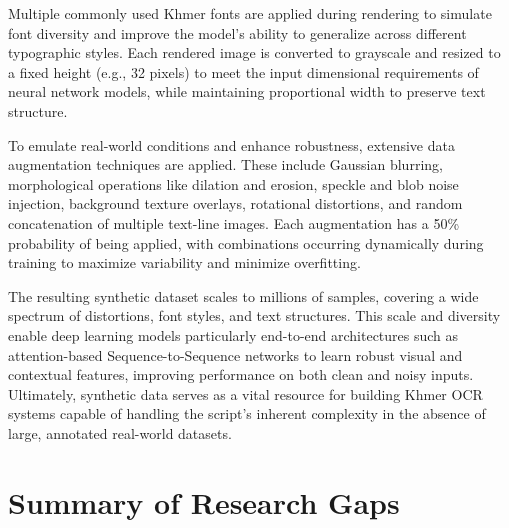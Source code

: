 Multiple commonly used Khmer fonts are applied during rendering to simulate font diversity and 
improve the model's ability to generalize across different typographic styles. Each rendered 
image is converted to grayscale and resized to a fixed height (e.g., 32 pixels) to meet the input 
dimensional requirements of neural network models, while maintaining proportional width to preserve 
text structure.

To emulate real-world conditions and enhance robustness, extensive data augmentation techniques 
are applied. These include Gaussian blurring, morphological operations like dilation and erosion, 
speckle and blob noise injection, background texture overlays, rotational distortions, and random 
concatenation of multiple text-line images. Each augmentation has a 50\% probability of being applied, 
with combinations occurring dynamically during training to maximize variability and minimize overfitting.

The resulting synthetic dataset scales to millions of samples, covering a wide spectrum of distortions, 
font styles, and text structures. This scale and diversity enable deep learning models particularly 
end-to-end architectures such as attention-based Sequence-to-Sequence networks to learn robust 
visual and contextual features, improving performance on both clean and noisy inputs. Ultimately, 
synthetic data serves as a vital resource for building Khmer OCR systems capable of handling the 
script’s inherent complexity in the absence of large, annotated real-world datasets.


\section{Summary of Research Gaps}
\label{sec:research-gaps}


